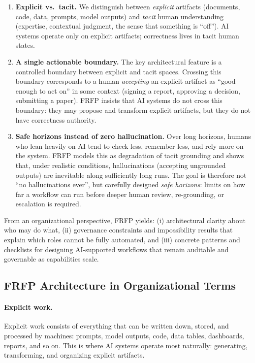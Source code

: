 \begin{enumerate}
  \item \textbf{Explicit vs.\ tacit.}
  We distinguish between \emph{explicit} artifacts (documents, code, data, prompts, model outputs) and \emph{tacit} human understanding (expertise, contextual judgment, the sense that something is ``off'').
  AI systems operate only on explicit artifacts; correctness lives in tacit human states.

  \item \textbf{A single actionable boundary.}
  The key architectural feature is a controlled boundary between explicit and tacit spaces.
  Crossing this boundary corresponds to a human \emph{accepting} an explicit artifact as ``good enough to act on'' in some context (signing a report, approving a decision, submitting a paper).
  FRFP insists that AI systems do not cross this boundary: they may propose and transform explicit artifacts, but they do not have correctness authority.

  \item \textbf{Safe horizons instead of zero hallucination.}
  Over long horizons, humans who lean heavily on AI tend to check less, remember less, and rely more on the system.
  FRFP models this as degradation of tacit grounding and shows that, under realistic conditions, hallucinations (accepting ungrounded outputs) are inevitable along sufficiently long runs.
  The goal is therefore not ``no hallucinations ever'', but carefully designed \emph{safe horizons}: limits on how far a workflow can run before deeper human review, re-grounding, or escalation is required.
\end{enumerate}

From an organizational perspective, FRFP yields:
(i) architectural clarity about who may do what,
(ii) governance constraints and impossibility results that explain which roles cannot be fully automated,
and (iii) concrete patterns and checklists for designing AI-supported workflows that remain auditable and governable as capabilities scale.

\subsection{FRFP Architecture in Organizational Terms}

\paragraph{Explicit work.}
Explicit work consists of everything that can be written down, stored, and processed by machines:
prompts, model outputs, code, data tables, dashboards, reports, and so on.
This is where AI systems operate most naturally: generating, transforming, and organizing explicit artifacts.

